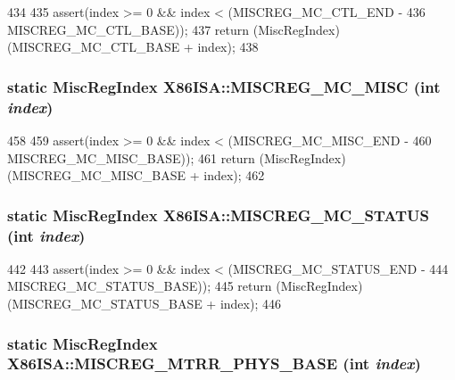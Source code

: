 \begin{DoxyCode}
434     {
435         assert(index >= 0 && index < (MISCREG_MC_CTL_END -
436                                       MISCREG_MC_CTL_BASE));
437         return (MiscRegIndex)(MISCREG_MC_CTL_BASE + index);
438     }
\end{DoxyCode}
\hypertarget{namespaceX86ISA_a50504e1ffcb068568a0d815d5e2c3c48}{
\subsubsection[{MISCREG\_\-MC\_\-MISC}]{\setlength{\rightskip}{0pt plus 5cm}static {\bf MiscRegIndex} X86ISA::MISCREG\_\-MC\_\-MISC (int {\em index})}}
\label{namespaceX86ISA_a50504e1ffcb068568a0d815d5e2c3c48}



\begin{DoxyCode}
458     {
459         assert(index >= 0 && index < (MISCREG_MC_MISC_END -
460                                       MISCREG_MC_MISC_BASE));
461         return (MiscRegIndex)(MISCREG_MC_MISC_BASE + index);
462     }
\end{DoxyCode}
\hypertarget{namespaceX86ISA_a788a5d14812b79f5e74448195f953858}{
\subsubsection[{MISCREG\_\-MC\_\-STATUS}]{\setlength{\rightskip}{0pt plus 5cm}static {\bf MiscRegIndex} X86ISA::MISCREG\_\-MC\_\-STATUS (int {\em index})}}
\label{namespaceX86ISA_a788a5d14812b79f5e74448195f953858}



\begin{DoxyCode}
442     {
443         assert(index >= 0 && index < (MISCREG_MC_STATUS_END -
444                                       MISCREG_MC_STATUS_BASE));
445         return (MiscRegIndex)(MISCREG_MC_STATUS_BASE + index);
446     }
\end{DoxyCode}
\hypertarget{namespaceX86ISA_a4376444d0ecbbff164d82b2e8a65471c}{
\subsubsection[{MISCREG\_\-MTRR\_\-PHYS\_\-BASE}]{\setlength{\rightskip}{0pt plus 5cm}static {\bf MiscRegIndex} X86ISA::MISCREG\_\-MTRR\_\-PHYS\_\-BASE (int {\em index})}}
\label{namespaceX86ISA_a4376444d0ecbbff164d82b2e8a65471c}



